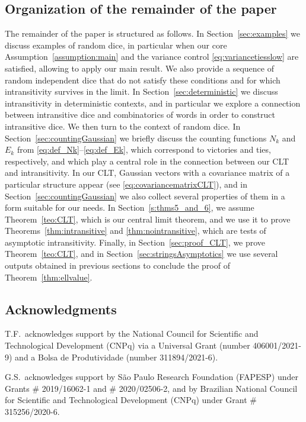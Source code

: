 \documentclass[reqno,a4paper,11pt]{amsart}
\theoremstyle{remark}
\numberwithin{equation}{section}
\begin{document}
\subsection{Organization of the remainder of the paper}\hfill


 The remainder of the paper is structured as follows.
 In Section~\ref{sec:examples} we discuss examples of random dice,  in particular  when our core Assumption~\ref{assumption:main} and the variance control \eqref{eq:variancetiesslow} are satisfied, allowing to apply our main result. We also provide a sequence of random independent dice that do not satisfy these conditions and for which intransitivity survives in the limit.
  In Section~\ref{sec:deterministic} we discuss intransitivity in deterministic contexts, and in particular we explore a connection between intransitive dice and combinatorics of words in order to construct intransitive dice.
  We then turn to the context of random dice. In Section~\ref{sec:countingGaussian} we briefly discuss the counting functions $N_k$ and $E_k$ from \eqref{eq:def_Nk}--\eqref{eq:def_Ek}, which correspond to victories and ties, respectively, and which play a central role in the connection between our CLT and intransitivity. 
In our CLT, Gaussian vectors with a covariance matrix of a particular structure appear (see \eqref{eq:covariancematrixCLT}), and in Section~\ref{sec:countingGaussian} we also collect several properties of them in a form suitable for our needs.
  In Section~\ref{s:thms5_and_6}, we assume Theorem~\ref{teo:CLT}, which is our central limit theorem, and we use it to prove Theorems~\ref{thm:intransitive} and \ref{thm:nointransitive}, which are tests of asymptotic intransitivity. Finally, in Section~\ref{sec:proof_CLT}, we prove Theorem~\ref{teo:CLT}, and in Section~\ref{sec:stringsAsymptotics} we use several outputs obtained in previous sections to conclude the proof of Theorem~\ref{thm:ellvalue}.

\subsection*{Acknowledgments}
T.F.\ acknowledges support by the National Council for Scientific and Technological Development (CNPq) via a Universal Grant (number 406001/2021-9) and a Bolsa de Produtividade (number 311894/2021-6). 

G.S.\ acknowledges support by São Paulo Research Foundation (FAPESP) under Grants \# 2019/16062-1 and \# 2020/02506-2, and by Brazilian National Council for Scientific and Technological Development (CNPq) under Grant \# 315256/2020-6.
\end{document}
